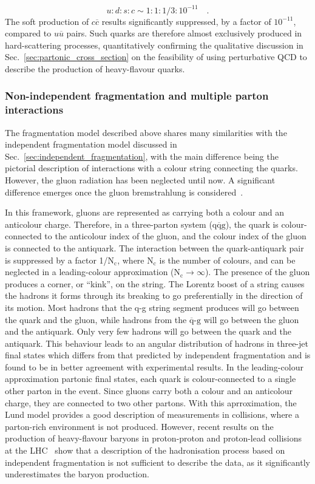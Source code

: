 \begin{equation*}
    u : d : s : c \sim 1 : 1 : 1/3 : 10^{-11}\quad .
\end{equation*}
The soft production of $c\overline{c}$ results significantly suppressed, by a factor of $10^{-11}$, compared to $u\overline{u}$ pairs. Such quarks are therefore almost exclusively produced in hard-scattering processes, quantitatively confirming the qualitative discussion in Sec.~\ref{sec:partonic_cross_section} on the feasibility of using perturbative QCD to describe the production of heavy-flavour quarks.

\subsubsection{Non-independent fragmentation and multiple parton interactions}
The fragmentation model described above shares many similarities with the independent fragmentation model discussed in Sec.~\ref{sec:independent_fragmentation}, with the main difference being the pictorial description of interactions with a colour string connecting the quarks. However, the gluon radiation has been neglected until now. A significant difference emerges once the gluon bremstrahlung is considered~\cite{Sjostrand:1984ic}. 

In this framework, gluons are represented as carrying both a colour and an anticolour charge. Therefore, in a three-parton system ($\mathrm{q\overline{q}g}$), the quark is colour-connected to the anticolour index of the gluon, and the colour index of the gluon is connected to the antiquark. The interaction between the quark-antiquark pair is suppressed by a factor 1/$\mathrm{N_c}$, where $\mathrm{N_c}$ is the number of colours, and can be neglected in a leading-colour approximation ($\mathrm{N_c} \rightarrow\infty$). The presence of the gluon produces a corner, or “kink”, on the string. The Lorentz boost of a string causes the hadrons it forms through its breaking to go preferentially in the direction of its motion. Most hadrons that the q-g string segment produces will go between the quark and the gluon, while hadrons from the $\mathrm{\overline{q}\text{-}g}$ will go between the gluon and the antiquark. Only very few hadrons will go between the quark and the antiquark. This behaviour leads to an angular distribution of hadrons in \ee three-jet final states which differs from that predicted by independent fragmentation and is found to be in better agreement with experimental results. In the leading-colour approximation partonic final states, each quark is colour-connected to a single other parton in the event. Since gluons carry both a colour and an anticolour charge, they are connected to two other partons. With this aprroximation, the Lund model provides a good description of measurements in \ee collisions, where a parton-rich environment is not produced. However, recent results on the production of heavy-flavour baryons in proton-proton and proton-lead collisions at the LHC~\cite{ALICE:2022exq,ALICE:2024ozd} show that a description of the hadronisation process based on independent fragmentation is not sufficient to describe the data, as it significantly underestimates the baryon production.

